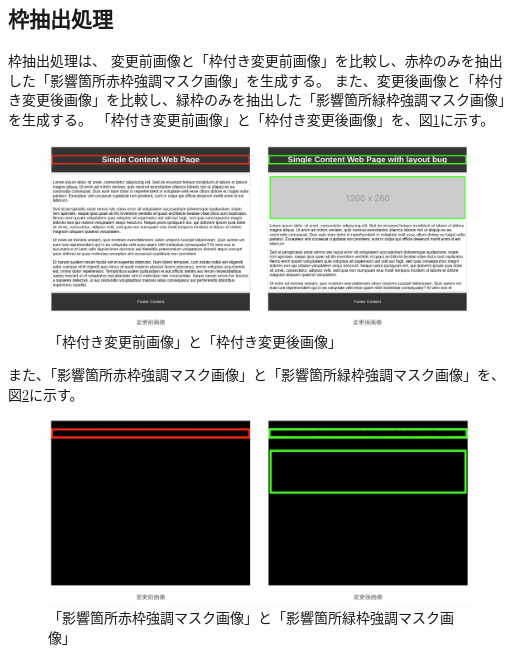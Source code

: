 
\subsection{枠抽出処理}\label{subsec:frame_extraction}
枠抽出処理は、
変更前画像と「枠付き変更前画像」を比較し、赤枠のみを抽出した「影響箇所赤枠強調マスク画像」を生成する。
また、変更後画像と「枠付き変更後画像」を比較し、緑枠のみを抽出した「影響箇所緑枠強調マスク画像」を生成する。
「枠付き変更前画像」と「枠付き変更後画像」を、図\ref{fig: html_waku}に示す。
\begin{figure}[tp]
    \begin{center}
        \includegraphics[width=1.0\columnwidth]{image/4_html_waku.png}
        \caption{「枠付き変更前画像」と「枠付き変更後画像」}
        \label{fig: html_waku}
    \end{center}
\end{figure}
また、「影響箇所赤枠強調マスク画像」と「影響箇所緑枠強調マスク画像」を、図\ref{fig: html_diff_mask}に示す。
\begin{figure}[tp]
    \begin{center}
        \includegraphics[width=1.0\columnwidth]{image/4_html_diff_mask.png}
        \caption{「影響箇所赤枠強調マスク画像」と「影響箇所緑枠強調マスク画像」}
        \label{fig: html_diff_mask}
    \end{center}
\end{figure}
